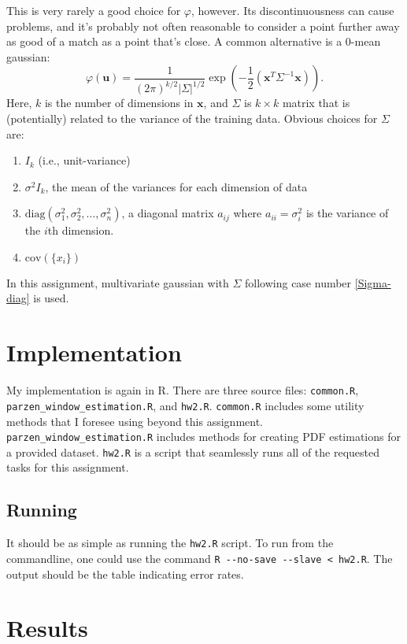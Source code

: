 \documentclass{article}
\begin{document}
This is very rarely a good choice for $\varphi$, however. Its discontinuousness
can cause problems, and it's probably not often reasonable to consider a point
further away as good of a match as a point that's close. A common alternative is
a 0-mean gaussian:
\[
	\varphi(\mathbf{u}) = \frac{1}{(2\pi)^{k/2}|\Sigma|^{1/2}} 
		\exp\left( -\frac{1}{2}\left(\mathbf{x}^{T} \Sigma^{-1}
		\mathbf{x}\right) \right).
\]
Here, $k$ is the number of dimensions in $\mathbf{x}$, and $\Sigma$ is $k \times
k$ matrix that is (potentially) related to the variance of the training data.
Obvious choices for $\Sigma$ are:
\begin{enumerate}
	\item $I_k$ (i.e., unit-variance)
	\item $\sigma^2 I_k$, the mean of the variances for each dimension of data
	\item \label{Sigma-diag}
	$\mbox{diag}\left( \sigma_1^2, \sigma_2^2, \dots, \sigma_n^2 \right)$,
	a diagonal matrix ${a_{ij}}$ where $a_{ii}=\sigma_i^2$ is the variance of
	the $i$th dimension.
	\item $\mbox{cov}\left( \{x_i\} \right)$
\end{enumerate}
In this assignment, multivariate gaussian with $\Sigma$ following case number
\ref{Sigma-diag} is used.

\section{Implementation}

My implementation is again in R. There are three source files: \verb|common.R|,
\verb|parzen_window_estimation.R|, and \verb|hw2.R|. \verb|common.R| includes
some utility methods that I foresee using beyond this assignment.
\verb|parzen_window_estimation.R| includes methods for creating PDF estimations
for a provided dataset. \verb|hw2.R| is a script that seamlessly runs all of the
requested tasks for this assignment.

\subsection{Running}

It should be as simple as running the \verb|hw2.R| script. To run from the
commandline, one could use the command \verb|R --no-save --slave < hw2.R|. The
output should be the table indicating error rates.

\section{Results}
\end{document}
